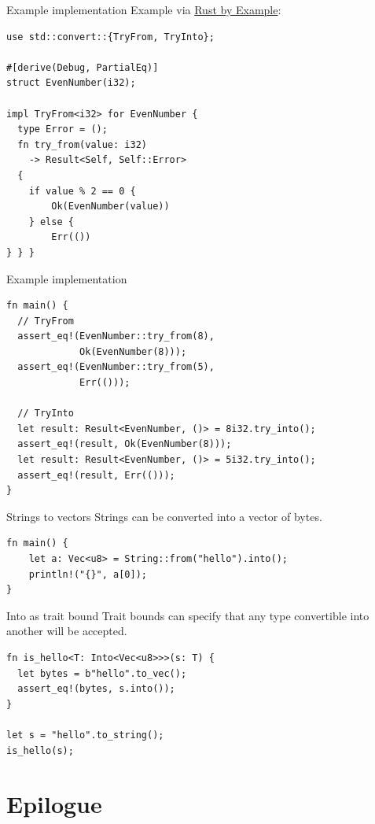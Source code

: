 \documentclass{beamer}
\begin{document}
\begin{frame}[fragile]{Example implementation}
  Example via \href{https://doc.rust-lang.org/stable/rust-by-example/conversion/try_from_try_into.html}{Rust by Example}:
  \begin{verbatim}
use std::convert::{TryFrom, TryInto};

#[derive(Debug, PartialEq)]
struct EvenNumber(i32);

impl TryFrom<i32> for EvenNumber {
  type Error = ();
  fn try_from(value: i32)
    -> Result<Self, Self::Error>
  {
    if value % 2 == 0 {
        Ok(EvenNumber(value))
    } else {
        Err(())
} } }
\end{verbatim}
\end{frame}

\begin{frame}[fragile]{Example implementation}
  \begin{verbatim}
fn main() {
  // TryFrom
  assert_eq!(EvenNumber::try_from(8),
             Ok(EvenNumber(8)));
  assert_eq!(EvenNumber::try_from(5),
             Err(()));

  // TryInto
  let result: Result<EvenNumber, ()> = 8i32.try_into();
  assert_eq!(result, Ok(EvenNumber(8)));
  let result: Result<EvenNumber, ()> = 5i32.try_into();
  assert_eq!(result, Err(()));
}
  \end{verbatim}
\end{frame}

\begin{frame}[fragile]{Strings to vectors}
  Strings can be converted into a vector of bytes.

  \begin{verbatim}
fn main() {
    let a: Vec<u8> = String::from("hello").into();
    println!("{}", a[0]);
}
  \end{verbatim}
\end{frame}

\begin{frame}[fragile]{Into as trait bound}
  Trait bounds can specify that any type convertible into another will be accepted.
  \begin{verbatim}
fn is_hello<T: Into<Vec<u8>>>(s: T) {
  let bytes = b"hello".to_vec();
  assert_eq!(bytes, s.into());
}

let s = "hello".to_string();
is_hello(s);
  \end{verbatim}
\end{frame}

\section{Epilogue}
\end{document}
